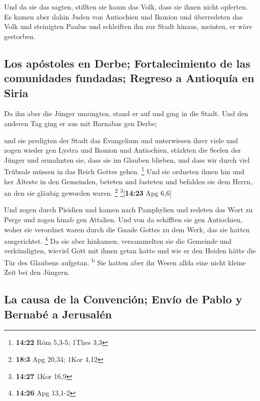  Und da sie das sagten, stillten sie kaum das Volk, dass
sie ihnen nicht opferten.  Es kamen aber dahin Juden von
Antiochien und Ikonion und überredeten das Volk und steinigten Paulus
und schleiften ihn zur Stadt hinaus, meinten, er wäre gestorben.

\hypertarget{los-apuxf3stoles-en-derbe-fortalecimiento-de-las-comunidades-fundadas-regreso-a-antioquuxeda-en-siria}{%
\subsection{Los apóstoles en Derbe; Fortalecimiento de las comunidades
fundadas; Regreso a Antioquía en
Siria}\label{los-apuxf3stoles-en-derbe-fortalecimiento-de-las-comunidades-fundadas-regreso-a-antioquuxeda-en-siria}}

 Da ihn aber die Jünger umringten, stand er auf und ging
in die Stadt. Und den anderen Tag ging er aus mit Barnabas gen Derbe;

 und sie predigten der Stadt das Evangelium und
unterwiesen ihrer viele und zogen wieder gen Lystra und Ikonion und
Antiochien,  stärkten die Seelen der Jünger und ermahnten
sie, dass sie im Glauben blieben, und dass wir durch viel Trübsale
müssen in das Reich Gottes gehen. \footnote{\textbf{14:22} Röm 5,3-5;
  1Thes 3,3}  Und sie ordneten ihnen hin und her Älteste
in den Gemeinden, beteten und fasteten und befahlen sie dem Herrn, an
den sie gläubig geworden waren. \footnote{\textbf{18:3} Apg 20,34; 1Kor
  4,12} \footnote{\textbf{14:27} 1Kor 16,9}{[}\textbf{14:23} Apg 6,6{]}

 Und zogen durch Pisidien und kamen nach Pamphylien
 und redeten das Wort zu Perge und zogen hinab gen
Attalien.  Und von da schifften sie gen Antiochien, woher
sie verordnet waren durch die Gnade Gottes zu dem Werk, das sie hatten
ausgerichtet. \footnote{\textbf{14:26} Apg 13,1-2}  Da
sie aber hinkamen, versammelten sie die Gemeinde und verkündigten,
wieviel Gott mit ihnen getan hatte und wie er den Heiden hätte die Tür
des Glaubens aufgetan. \textsuperscript{b}  Sie hatten
aber ihr Wesen allda eine nicht kleine Zeit bei den Jüngern.

\hypertarget{la-causa-de-la-convenciuxf3n-envuxedo-de-pablo-y-bernabuxe9-a-jerusaluxe9n}{%
\subsection{La causa de la Convención; Envío de Pablo y Bernabé a
Jerusalén}\label{la-causa-de-la-convenciuxf3n-envuxedo-de-pablo-y-bernabuxe9-a-jerusaluxe9n}}

